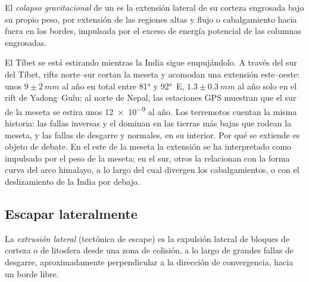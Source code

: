 \begin{definition}\label{def:b2:himalaya-andes:collapse}
El \emph{colapso gravitacional} de un 
es la extensión lateral de su corteza engrosada bajo su propio peso, por extensión de las regiones
altas y flujo o cabalgamiento hacia fuera en los bordes, impulsada por el exceso de energía potencial de
las columnas engrosadas.
\end{definition}

El Tíbet se está estirando mientras la India sigue empujándolo. A través del sur del Tíbet, rifts
norte--sur cortan la meseta y acomodan una extensión este--oeste: unos $9 \pm \qty{2}{mm}$ al año en
total entre \ang{81} y \ang{92}~E, $1.3 \pm \qty{0.3}{mm}$ al año solo en el rift de
Yadong--Gulu; al norte de Nepal, las estaciones GPS muestran que el sur de la meseta se estira unos
\num{12e-9} al año. Los terremotos cuentan la misma historia: las fallas inversas y el 
dominan en las tierras más bajas que rodean la meseta, y las fallas de desgarre y normales, en su interior.
Por qué se extiende es objeto de debate. En el este de la meseta la extensión se ha interpretado como  impulsado por el peso de la meseta; en el sur, otros la relacionan con la forma curva
del arco himalayo, a lo largo del cual divergen los cabalgamientos, o con el deslizamiento de la India por debajo.

\subsection{Escapar lateralmente}

\begin{definition}\label{def:b2:himalaya-andes:extrusion}
La \emph{extrusión lateral} (tectónica de escape) es la expulsión lateral de
bloques de corteza o de litosfera desde una zona de colisión, a lo largo de grandes fallas de desgarre,
aproximadamente perpendicular a la dirección de convergencia, hacia un borde libre.
\end{definition}

